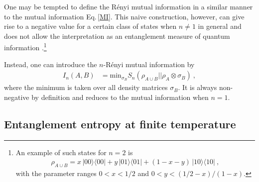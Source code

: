 One may be tempted to define the R{\'e}nyi mutual information in a similar manner to the mutual information Eq.\,\eqref{MI}.
This naive construction, however, can give rise to a negative value for a certain class of states when $n\neq 1$ in general and does not allow the interpretation as an entanglement measure of quantum information \cite{adesso2012measuring}.\footnote{An example of such states for $n=2$ is
\begin{align}
	\rho_{A\cup B} = x\, |00\rangle \langle 00| + y\, |01\rangle \langle 01| + (1-x-y)\, |10\rangle \langle 10| \ ,
\end{align}
with the parameter ranges $0< x < 1/2$ and $0< y < (1/2 -x)/(1-x)$.
}

Instead, one can introduce the $n$-R{\'e}nyi mutual information by \cite{beigi2013sandwiched}
\begin{align}
	I_n(A, B) &=  \text{min}_{\sigma_B} S_n(\rho_{A\cup B} || \rho_A \otimes \sigma_B) \ ,
\end{align}
where the minimum is taken over all density matrices $\sigma_B$.
It is always non-negative by definition and reduces to the mutual information when $n=1$.



\subsection{Entanglement entropy at finite temperature}


